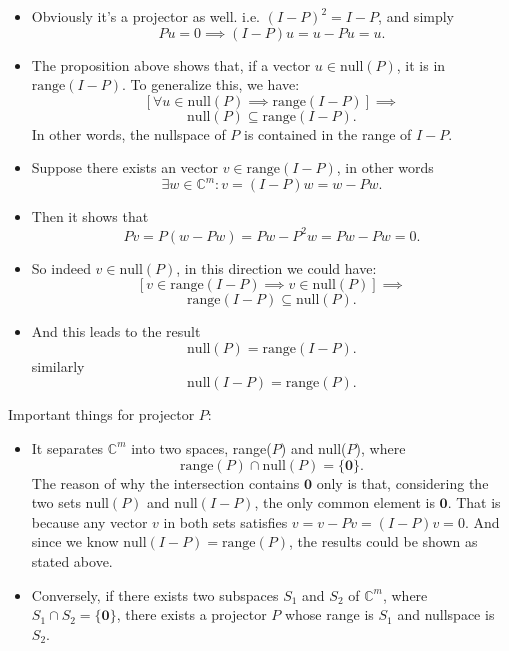 \begin{itemize}
  \item Obviously it's a projector as well. i.e. $(I - P)^2 = I - P$, and simply
    \[
      Pu = 0 \implies (I - P)u = u - Pu = u
    .\]
  \item The proposition above shows that, if a vector $u \in \text{null}(P)$, it is in $\text{range}(I - P)$. To generalize this, we have:
    \[
      [\forall u \in \text{null}(P) \implies \text{range}(I - P)] \implies
    \]
    \[
      \text{null}(P) \subseteq \text{range}(I - P)
    .\] 
    In other words, the nullspace of $P$ is contained in the range of $I - P$.
  \item Suppose there exists an vector $v \in \text{range}(I - P)$, in other words
    \[
      \exists w \in \mathbb{C}^{m}: v = (I - P)w = w - Pw
    .\]
  \item Then it shows that
    \[
      Pv = P(w - Pw) = Pw - P^2w = Pw - Pw = 0
    .\] 
  \item So indeed $v \in \text{null}(P)$, in this direction we could have:
    \[
      [v \in \text{range}(I - P) \implies v \in \text{null}(P)] \implies
    \]
    \[
      \text{range}(I - P) \subseteq \text{null}(P)
    .\]
    \item And this leads to the result
      \[
        \text{null}(P) = \text{range}(I - P)
      .\]
      similarly
      \[
        \text{null}(I - P) = \text{range}(P)
      .\] 
\end{itemize}
Important things for projector $P$: 
\begin{itemize}
\item  It separates  $\mathbb{C}^{m}$ into two spaces, range($P$) and null($P$), where 
  \[
  \text{range}(P) \cap \text{null}(P) = \{\textbf{0}\}
  .\] 
  The reason of why the intersection contains $\textbf{0}$ only is that, considering the two sets $\text{null}(P)$ and $\text{null}(I - P)$, the only common element is $\textbf{0}$. That is because any vector $v$ in both sets satisfies $v = v - Pv = (I - P)v = 0$. And since we know $\text{null}(I - P) = \text{range}(P)$, the results could be shown as stated above. 

\item Conversely, if there exists two subspaces $S_1$ and $S_2$ of $\mathbb{C}^{m}$, where $S_1 \cap S_2 = \{\textbf{0}\}$, there exists a projector $P$ whose range is $S_1$ and nullspace is $S_2$.
\end{itemize}
